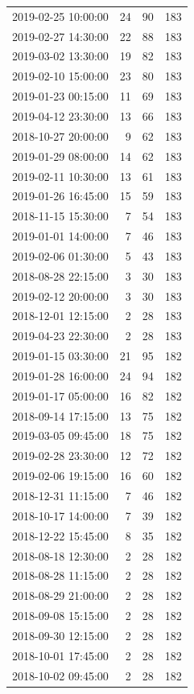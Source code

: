 \begin{tabular}{lrrr}
2019-02-25 10:00:00 & 24 & 90 & 183 \\
2019-02-27 14:30:00 & 22 & 88 & 183 \\
2019-03-02 13:30:00 & 19 & 82 & 183 \\
2019-02-10 15:00:00 & 23 & 80 & 183 \\
2019-01-23 00:15:00 & 11 & 69 & 183 \\
2019-04-12 23:30:00 & 13 & 66 & 183 \\
2018-10-27 20:00:00 & 9 & 62 & 183 \\
2019-01-29 08:00:00 & 14 & 62 & 183 \\
2019-02-11 10:30:00 & 13 & 61 & 183 \\
2019-01-26 16:45:00 & 15 & 59 & 183 \\
2018-11-15 15:30:00 & 7 & 54 & 183 \\
2019-01-01 14:00:00 & 7 & 46 & 183 \\
2019-02-06 01:30:00 & 5 & 43 & 183 \\
2018-08-28 22:15:00 & 3 & 30 & 183 \\
2019-02-12 20:00:00 & 3 & 30 & 183 \\
2018-12-01 12:15:00 & 2 & 28 & 183 \\
2019-04-23 22:30:00 & 2 & 28 & 183 \\
2019-01-15 03:30:00 & 21 & 95 & 182 \\
2019-01-28 16:00:00 & 24 & 94 & 182 \\
2019-01-17 05:00:00 & 16 & 82 & 182 \\
2018-09-14 17:15:00 & 13 & 75 & 182 \\
2019-03-05 09:45:00 & 18 & 75 & 182 \\
2019-02-28 23:30:00 & 12 & 72 & 182 \\
2019-02-06 19:15:00 & 16 & 60 & 182 \\
2018-12-31 11:15:00 & 7 & 46 & 182 \\
2018-10-17 14:00:00 & 7 & 39 & 182 \\
2018-12-22 15:45:00 & 8 & 35 & 182 \\
2018-08-18 12:30:00 & 2 & 28 & 182 \\
2018-08-28 11:15:00 & 2 & 28 & 182 \\
2018-08-29 21:00:00 & 2 & 28 & 182 \\
2018-09-08 15:15:00 & 2 & 28 & 182 \\
2018-09-30 12:15:00 & 2 & 28 & 182 \\
2018-10-01 17:45:00 & 2 & 28 & 182 \\
2018-10-02 09:45:00 & 2 & 28 & 182 \\

\end{tabular}
